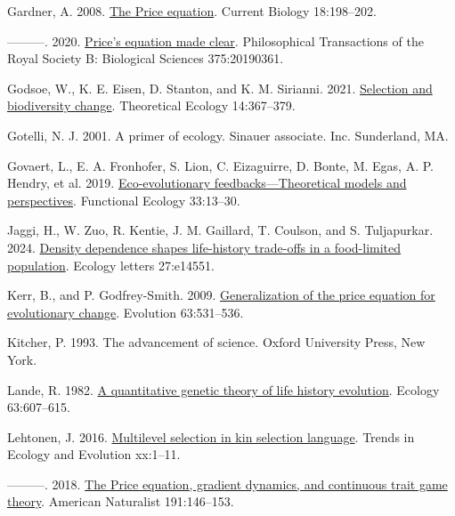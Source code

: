 \documentclass[
]{article}
\newlength{\cslhangindent}
\newenvironment{CSLReferences}[2] %
 {\begin{list}{}{%
  \setlength{\itemindent}{0pt}
  \setlength{\leftmargin}{0pt}
  \setlength{\parsep}{0pt}
  \ifodd #1
   \setlength{\leftmargin}{\cslhangindent}
   \setlength{\itemindent}{-1\cslhangindent}
  \fi
  \setlength{\itemsep}{#2\baselineskip}}}
 {\end{list}}
\begin{document}
\begin{CSLReferences}{0}{0}
Gardner, A. 2008. \href{https://doi.org/10.1016/j.cub.2008.01.005}{{The
Price equation}}. Current Biology 18:198--202.

---------. 2020. \href{https://doi.org/10.1098/rstb.2019.0361}{{Price's
equation made clear}}. Philosophical Transactions of the Royal Society
B: Biological Sciences 375:20190361.

Godsoe, W., K. E. Eisen, D. Stanton, and K. M. Sirianni. 2021.
\href{https://doi.org/10.1007/s12080-020-00478-3}{Selection and
biodiversity change}. Theoretical Ecology 14:367--379.

Gotelli, N. J. 2001. A primer of ecology. Sinauer associate. Inc.
Sunderland, MA.

Govaert, L., E. A. Fronhofer, S. Lion, C. Eizaguirre, D. Bonte, M. Egas,
A. P. Hendry, et al. 2019.
\href{https://doi.org/10.1111/1365-2435.13241}{{Eco-evolutionary
feedbacks---Theoretical models and perspectives}}. Functional Ecology
33:13--30.

Jaggi, H., W. Zuo, R. Kentie, J. M. Gaillard, T. Coulson, and S.
Tuljapurkar. 2024. \href{https://doi.org/10.1111/ele.14551}{Density
dependence shapes life-history trade-offs in a food-limited population}.
Ecology letters 27:e14551.

Kerr, B., and P. Godfrey-Smith. 2009.
\href{https://doi.org/10.1111/j.1558-5646.2008.00570.x}{{Generalization
of the price equation for evolutionary change}}. Evolution 63:531--536.

Kitcher, P. 1993. {The advancement of science}. Oxford University Press,
New York.

Lande, R. 1982. \href{https://doi.org/10.2307/1936778}{{A quantitative
genetic theory of life history evolution}}. Ecology 63:607--615.

Lehtonen, J. 2016.
\href{https://doi.org/10.1016/j.tree.2016.07.006}{{Multilevel selection
in kin selection language}}. Trends in Ecology and Evolution xx:1--11.

---------. 2018. \href{https://doi.org/10.1086/694891}{{The Price
equation, gradient dynamics, and continuous trait game theory}}.
American Naturalist 191:146--153.


\end{CSLReferences}
\end{document}
